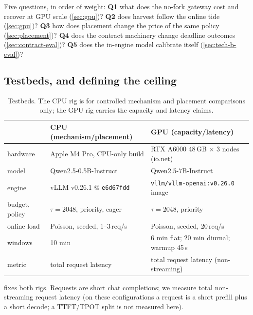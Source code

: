 \documentclass[conference]{IEEEtran}
\newcommand{\code}[1]{\texttt{#1}}
\begin{document}
Five questions, in order of weight: \textbf{Q1} what does the no-fork gateway cost and
recover at GPU scale (\cref{sec:gpu})? \textbf{Q2} does harvest follow the online tide
(\cref{sec:gpu})? \textbf{Q3} how does placement change the price of the same policy
(\cref{sec:placement})? \textbf{Q4} does the contract machinery change deadline outcomes
(\cref{sec:contract-eval})? \textbf{Q5} does the in-engine model calibrate itself
(\cref{sec:tech-b-eval})?

\subsection{Testbeds, and defining the ceiling}
\label{sec:ceiling}

\begin{table}[t]
\centering
\small
\caption{Testbeds. The CPU rig is for controlled mechanism and placement comparisons
only; the GPU rig carries the capacity and latency claims.}
\label{tab:testbeds}
\begin{tabular}{lll}
\toprule
 & CPU (mechanism/placement) & GPU (capacity/latency) \\
\midrule
hardware & Apple M4 Pro, CPU-only build & RTX A6000 48\,GB $\times$ 3 nodes (io.net) \\
model & Qwen2.5-0.5B-Instruct & Qwen2.5-7B-Instruct \\
engine & vLLM v0.26.1 @ \code{e6d67fdd} & \code{vllm/vllm-openai:v0.26.0} image \\
budget, policy & $\tau{=}2048$, priority, eager & $\tau{=}2048$, priority \\
online load & Poisson, seeded, 1--3\,req/s & Poisson, seeded, 20\,req/s \\
windows & 10 min & 6 min flat; 20 min diurnal; warmup 45\,s \\
metric & total request latency & total request latency (non-streaming) \\
\bottomrule
\end{tabular}
\end{table}

 fixes both rigs. Requests are short chat completions; we measure
total non-streaming request latency (on these configurations a request is a short prefill
plus a short decode; a TTFT/TPOT split is not measured here).
\end{document}
